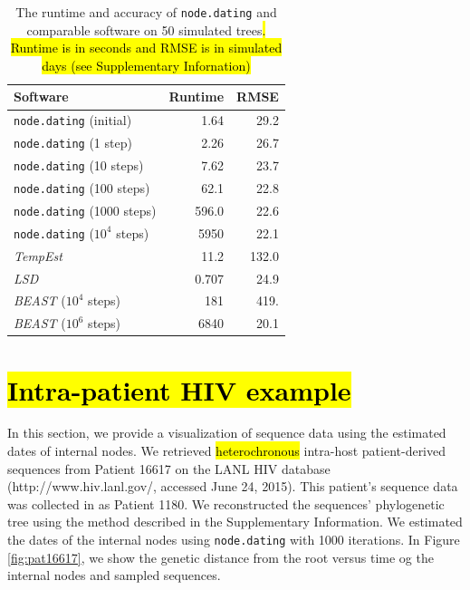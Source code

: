 \documentclass{bioinfo}
\newcommand{\code}[1]{{\tt #1}}
\newcommand{\edit}[1]{\hl{#1}}
\begin{document}
\begin{table}[t]
	\caption[Runtime and accuracy]{The runtime and accuracy of \code{node.dating} and comparable software on 50 simulated trees\edit{. Runtime is in seconds and RMSE is in simulated days (see Supplementary Infornation)} }
	\label{tab:runtime}
	\centering
	\begin{tabular}{lrr}
		\hline
		Software & Runtime\edit{ } & RMSE\edit{ } \\
		\hline
		\code{node.dating} (initial) & 1.64 & 29.2 \\
		\code{node.dating} (1 step) & 2.26 & 26.7 \\
		\code{node.dating} (10 steps) & 7.62 & 23.7 \\
		\code{node.dating} (100 steps) & 62.1 & 22.8 \\
		\code{node.dating} (1000 steps) & 596.0 & 22.6 \\
		\code{node.dating} ($10^4$ steps) & 5950 & 22.1 \\
		\emph{TempEst} & 11.2 & 132.0 \\
		\emph{LSD} & 0.707 & 24.9 \\
		\emph{BEAST} ($10^4$ steps) & 181 & 419. \\
		\emph{BEAST} ($10^6$ steps) & 6840 & 20.1 \\
		\hline
	\end{tabular}
\end{table}

\vspace*{-18pt}

\section{\edit{Intra-patient HIV example}} \label{sec:vis}
In this section, we provide a visualization of sequence data using the estimated dates of internal nodes.
We retrieved \edit{heterochronous} intra-host patient-derived sequences from Patient 16617 on the LANL HIV database (http://www.hiv.lanl.gov/, accessed June 24, 2015).
This patient's sequence data was collected in \cite{Llewellyn06} as Patient 1180.
We reconstructed the sequences' phylogenetic tree using the method described in the Supplementary Information.
We \edit{ } estimated the dates of the internal nodes using \code{node.dating} with 1000 iterations. 
In Figure \ref{fig:pat16617}, we show the genetic distance from the root versus time og the internal nodes and sampled sequences.
\end{document}
